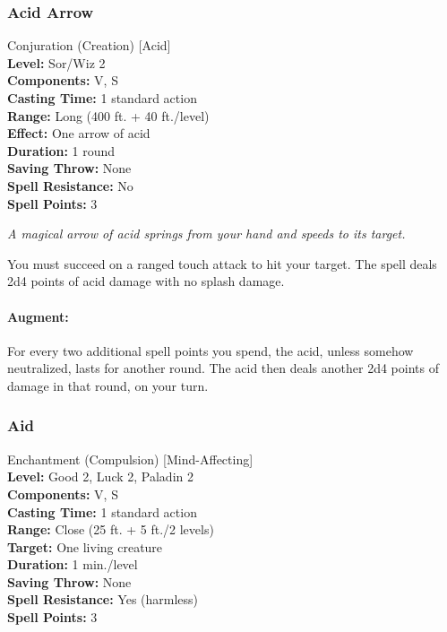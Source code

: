 \subsubsection{Acid Arrow}
\label{Spell:AcidArrow}
Conjuration (Creation) [Acid]
\\ \textbf{Level:} Sor/Wiz 2
\\ \textbf{Components:} V, S
\\ \textbf{Casting Time:} 1 standard action
\\ \textbf{Range:} Long (400 ft. + 40 ft./level)
\\ \textbf{Effect:} One arrow of acid
\\ \textbf{Duration:} 1 round
\\ \textbf{Saving Throw:} None
\\ \textbf{Spell Resistance:} No
\\ \textbf{Spell Points:} 3

\emph{A magical arrow of acid springs from your hand and speeds to its target.}

You must succeed on a ranged touch attack to hit your target.
The spell deals 2d4 points of acid damage with no splash damage.

\paragraph{Augment:}
For every two additional spell points you spend, the acid, unless somehow neutralized, lasts for another round. 
The acid then deals another 2d4 points of damage in that round, on your turn.

\subsubsection{Aid}
\label{Spell:Aid}
Enchantment (Compulsion) [Mind-Affecting]
\\ \textbf{Level:} Good 2, Luck 2, Paladin 2
\\ \textbf{Components:} V, S
\\ \textbf{Casting Time:} 1 standard action
\\ \textbf{Range:} Close (25 ft. + 5 ft./2 levels)
\\ \textbf{Target:} One living creature
\\ \textbf{Duration:} 1 min./level
\\ \textbf{Saving Throw:} None
\\ \textbf{Spell Resistance:} Yes (harmless)
\\ \textbf{Spell Points:} 3

